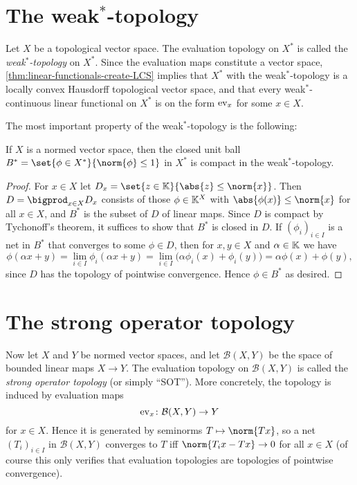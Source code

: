 \documentclass[article, a4paper, 11pt, oneside]{memoir}
\numberwithin{equation}{chapter}
\newcommand{\calB}{\mathcal{B}}
\begin{document}
\section[The weak*-topology][The weak$^*$-topology]{The weak$^*$-topology}

Let $X$ be a topological vector space. The evaluation topology on $X^*$ is called the \emph{weak$^*$-topology} on $X^*$. Since the evaluation maps constitute a vector space, \cref{thm:linear-functionals-create-LCS} implies that $X^*$ with the weak$^*$-topology is a locally convex Hausdorff topological vector space, and that every weak$^*$-continuous linear functional on $X^*$ is on the form $\mathrm{ev}_x$ for some $x \in X$.

The most important property of the weak$^*$-topology is the following:

\begin{theorem}
    If $X$ is a normed vector space, then the closed unit ball $B^* = \set{\phi \in X^*}{\norm{\phi} \leq 1}$ in $X^*$ is compact in the weak$^*$-topology.
\end{theorem}

\begin{proof}
    For $x \in X$ let $D_x = \set{z \in \field}{\abs{z} \leq \norm{x}}$. Then $D = \bigprod_{x \in X} D_x$ consists of those $\phi \in \mathbb{K}^X$ with $\abs{\phi(x)} \leq \norm{x}$ for all $x \in X$, and $B^*$ is the subset of $D$ of linear maps. Since $D$ is compact by Tychonoff's theorem, it suffices to show that $B^*$ is closed in $D$. If $(\phi_i)_{i \in I}$ is a net in $B^*$ that converges to some $\phi \in D$, then for $x,y \in X$ and $\alpha \in \mathbb{K}$ we have
    \begin{equation*}
        \phi(\alpha x + y)
            = \lim_{i \in I} \phi_i(\alpha x + y)
            = \lim_{i \in I} \bigl( \alpha \phi_i(x) + \phi_i(y) \bigr)
            = \alpha \phi(x) + \phi(y),
    \end{equation*}
    since $D$ has the topology of pointwise convergence. Hence $\phi \in B^*$ as desired.
\end{proof}


\section{The strong operator topology}

Now let $X$ and $Y$ be normed vector spaces, and let $\calB(X,Y)$ be the space of bounded linear maps $X \to Y$. The evaluation topology on $\calB(X,Y)$ is called the \emph{strong operator topology} (or simply \enquote{SOT}). More concretely, the topology is induced by evaluation maps
%
\begin{equation*}
    \ev_x \colon \calB(X,Y) \to Y
\end{equation*}
%
for $x \in X$. Hence it is generated by seminorms $T \mapsto \norm{Tx}$, so a net $(T_i)_{i \in I}$ in $\calB(X,Y)$ converges to $T$ iff $\norm{T_i x - Tx} \to 0$ for all $x \in X$ (of course this only verifies that evaluation topologies are topologies of pointwise convergence).
    
\end{document}
